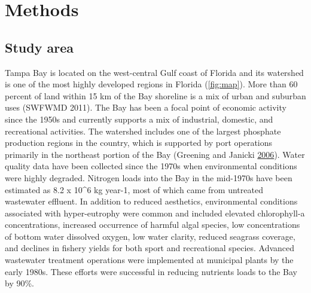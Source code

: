 \documentclass[]{article}
\begin{document}
\hypertarget{methods}{%
\section{Methods}\label{methods}}

\hypertarget{study-area}{%
\subsection{Study area}\label{study-area}}

Tampa Bay is located on the west-central Gulf coast of Florida and its
watershed is one of the most highly developed regions in Florida
(\cref{fig:map}). More than 60 percent of land within 15 km of the Bay
shoreline is a mix of urban and suburban uses (SWFWMD 2011). The Bay has
been a focal point of economic activity since the 1950s and currently
supports a mix of industrial, domestic, and recreational activities. The
watershed includes one of the largest phosphate production regions in
the country, which is supported by port operations primarily in the
northeast portion of the Bay (Greening and Janicki
\protect\hyperlink{ref-Greening06}{2006}). Water quality data have been
collected since the 1970s when environmental conditions were highly
degraded. Nitrogen loads into the Bay in the mid-1970s have been
estimated as 8.2 x 10\^{}6 kg year-1, most of which came from untreated
wastewater effluent. In addition to reduced aesthetics, environmental
conditions associated with hyper-eutrophy were common and included
elevated chlorophyll-a concentrations, increased occurrence of harmful
algal species, low concentrations of bottom water dissolved oxygen, low
water clarity, reduced seagrass coverage, and declines in fishery yields
for both sport and recreational species. Advanced wastewater treatment
operations were implemented at municipal plants by the early 1980s.
These efforts were successful in reducing nutrients loads to the Bay by
90\%.
\end{document}

